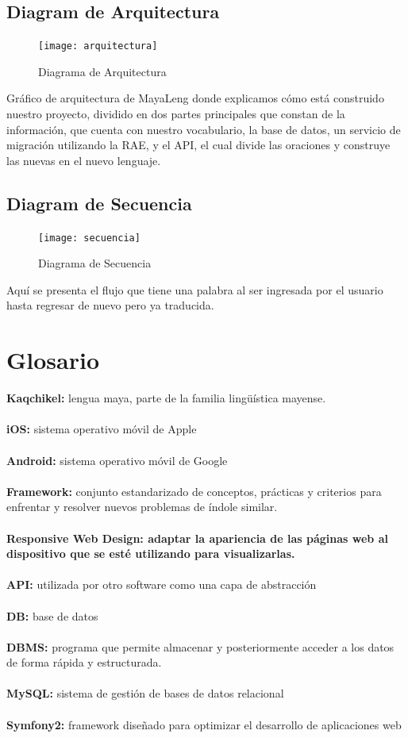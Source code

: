 \documentclass[a4paper,openright,11pt]{article}
\begin{document}
\subsection{Diagram de Arquitectura}
\begin{figure}[h]
	\centering
	\texttt{[image: arquitectura]}
	\caption{Diagrama de Arquitectura}
	\label{fig:arq}
\end{figure}
Gráfico de arquitectura de MayaLeng donde explicamos cómo está construido nuestro proyecto, dividido en dos partes principales que constan de la información, que cuenta con nuestro vocabulario, la base de datos, un servicio de migración utilizando la RAE, y el API, el cual divide las oraciones y construye las nuevas en el nuevo lenguaje.

\subsection{Diagram de Secuencia}
\begin{figure}[h]
	\centering
	\texttt{[image: secuencia]}
	\caption{Diagrama de Secuencia}
	\label{fig:sec}
\end{figure}
Aquí se presenta el flujo que tiene una palabra al ser ingresada por el usuario hasta regresar de nuevo pero ya traducida.
\newpage

\section{Glosario}
\noindent \textbf{Kaqchikel: } lengua maya, parte de la familia lingüística mayense. \\\\
\textbf{iOS: } sistema operativo móvil de Apple \\\\
\textbf{Android: } sistema operativo móvil de Google \\\\
\textbf{Framework: } conjunto estandarizado de conceptos, prácticas y criterios para enfrentar y resolver nuevos problemas de índole similar. \\\\
\textbf{Responsive Web Design:  adaptar la apariencia de las páginas web al dispositivo que se esté utilizando para visualizarlas. }  \\\\
\textbf{API:  } utilizada por otro software como una capa de abstracción \\\\
\textbf{DB: } base de datos \\\\
\textbf{DBMS: } programa que permite almacenar y posteriormente acceder a los datos de forma rápida y estructurada.\\\\
\textbf{MySQL: }  sistema de gestión de bases de datos relacional \\\\
\textbf{Symfony2: } framework diseñado para optimizar el desarrollo de aplicaciones web\\ \\
\newpage

\pagestyle{fancy}
\end{document}
